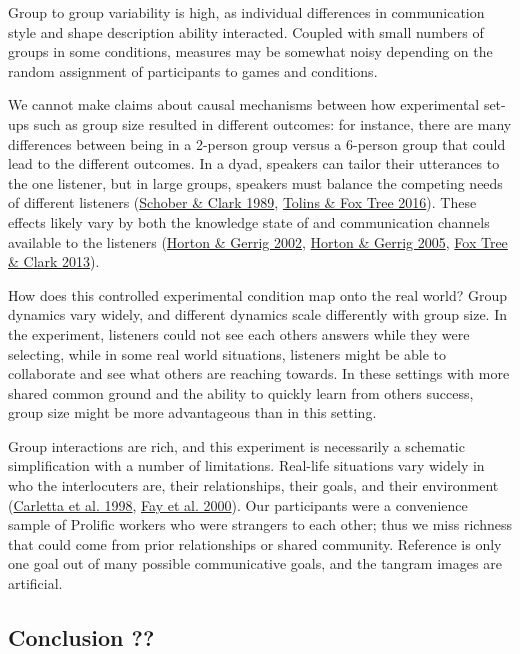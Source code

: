 \documentclass[
  english,
  a4paper,
]{article}
\begin{document}
Group to group variability is high, as individual differences in communication style and shape description ability interacted. Coupled with small numbers of groups in some conditions, measures may be somewhat noisy depending on the random assignment of participants to games and conditions.

We cannot make claims about causal mechanisms between how experimental set-ups such as group size resulted in different outcomes: for instance, there are many differences between being in a 2-person group versus a 6-person group that could lead to the different outcomes. In a dyad, speakers can tailor their utterances to the one listener, but in large groups, speakers must balance the competing needs of different listeners (\protect\hyperlink{ref-schober1989}{Schober \& Clark 1989}, \protect\hyperlink{ref-tolins2016}{Tolins \& Fox Tree 2016}). These effects likely vary by both the knowledge state of and communication channels available to the listeners (\protect\hyperlink{ref-horton2002}{Horton \& Gerrig 2002}, \protect\hyperlink{ref-horton2005}{Horton \& Gerrig 2005}, \protect\hyperlink{ref-fox-tree2013}{Fox Tree \& Clark 2013}).

How does this controlled experimental condition map onto the real world? Group dynamics vary widely, and different dynamics scale differently with group size. In the experiment, listeners could not see each others answers while they were selecting, while in some real world situations, listeners might be able to collaborate and see what others are reaching towards. In these settings with more shared common ground and the ability to quickly learn from others success, group size might be more advantageous than in this setting.

Group interactions are rich, and this experiment is necessarily a schematic simplification with a number of limitations. Real-life situations vary widely in who the interlocuters are, their relationships, their goals, and their environment (\protect\hyperlink{ref-carletta1998}{Carletta et al. 1998}, \protect\hyperlink{ref-fay2000}{Fay et al. 2000}). Our participants were a convenience sample of Prolific workers who were strangers to each other; thus we miss richness that could come from prior relationships or shared community. Reference is only one goal out of many possible communicative goals, and the tangram images are artificial.

\hypertarget{conclusion}{%
\subsection{Conclusion ??}\label{conclusion}}
\end{document}
